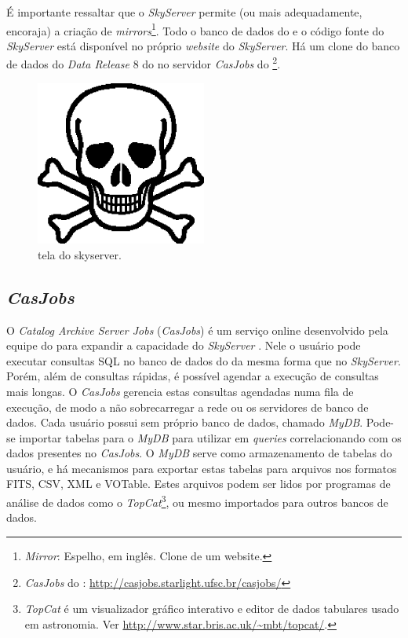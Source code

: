 É importante ressaltar que o {\em SkyServer} permite (ou mais adequadamente,
encoraja) a criação de {\em mirrors}\footnote{{\em Mirror}: Espelho, em inglês.
Clone de um website.}. Todo o banco de dados do \SDSS e o código fonte do {\em
SkyServer} está disponível no próprio {\em website} do {\em SkyServer}. Há um
clone do banco de dados do {\em Data Release} 8 do \SDSS no servidor {\em
CasJobs} do \starlight \footnote{{\em CasJobs} do \starlight:
\url{http://casjobs.starlight.ufsc.br/casjobs/}}.

\begin{figure}
	\includegraphics[width=0.5\textwidth]{figuras/test.eps}
	\caption[Tela do skyserver.]
	{tela do skyserver.}
	\label{fig:TelaDoSkyServer}
\end{figure}

\subsection{{\em CasJobs}}
\label{sec:CrossMatch:SDSS:CasJobs}
O {\em Catalog Archive Server Jobs} ({\em CasJobs}) é um serviço online
desenvolvido pela equipe do \SDSS para expandir a capacidade do {\em SkyServer}
\citep{Li2008}. Nele o usuário pode executar consultas SQL no banco de dados do
\SDSS da mesma forma que no {\em SkyServer}. Porém, além de consultas rápidas, é
possível agendar a execução de consultas mais longas. O {\em CasJobs} gerencia
estas consultas agendadas numa fila de execução, de modo a não sobrecarregar a
rede ou os servidores de banco de dados. Cada usuário possui sem próprio banco
de dados, chamado {\em MyDB}. Pode-se importar tabelas para o {\em MyDB} para
utilizar em {\em queries} correlacionando com os dados presentes no {\em
CasJobs}. O {\em MyDB} serve como armazenamento de tabelas do usuário, e há
mecanismos para exportar estas tabelas para arquivos nos formatos FITS, CSV, XML
e VOTable. Estes arquivos podem ser lidos por programas de análise de dados como
o {\em TopCat}\footnote{{\em TopCat} é um visualizador gráfico interativo e
editor de dados tabulares usado em astronomia. Ver
\url{http://www.star.bris.ac.uk/~mbt/topcat/}.}, ou mesmo importados para outros
bancos de dados.

